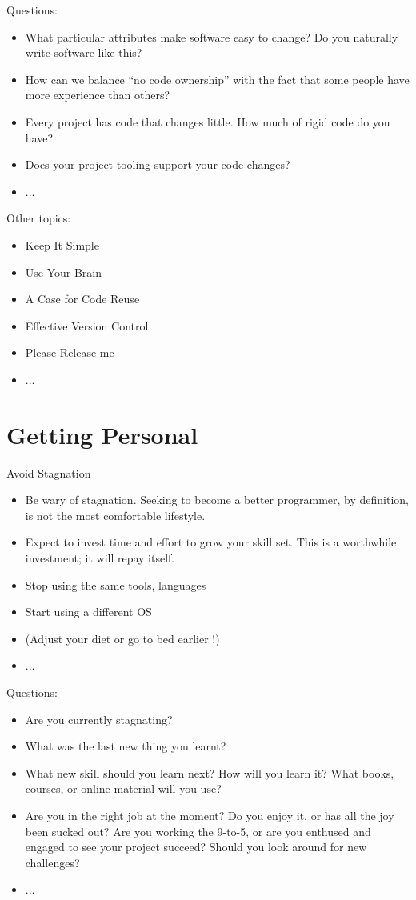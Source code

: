 \documentclass{mypresentation}
\begin{document}
Questions:
\begin{itemize}
\item What particular attributes make software easy to change? Do you naturally write software like this? 
\item How can we balance “no code ownership” with the fact that some people have more experience than others?
\item Every project has code that changes little. How much of rigid code do you have?
\item Does your project tooling support your code changes?
\item ...
\end{itemize}
\newpage

Other topics:
\begin{itemize}
\item Keep It Simple
\item Use Your Brain
\item A Case for Code Reuse
\item Effective Version Control
\item Please Release me
\item ...
\end{itemize}
\newpage

\section{Getting Personal}
Avoid Stagnation
\begin{itemize}
\item Be wary of stagnation. Seeking to become a better programmer, by definition, is not the most comfortable lifestyle.
\item Expect to invest time and effort to grow your skill set. This is a worthwhile investment; it will repay itself.
\item Stop using the same tools, languages
\item Start using a different OS
\item (Adjust your diet or go to bed earlier !)
\item ...
\end{itemize}
\newpage

Questions:
\begin{itemize}
\item Are you currently stagnating? 
\item What was the last new thing you learnt?
\item What new skill should you learn next? How will you learn it? What books, courses, or online material will you use?
\item Are you in the right job at the moment? Do you enjoy it, or has all the joy been sucked out? Are you working the 9-to-5, or are you enthused and engaged to see your project succeed? Should you look around for new challenges?
\item ...
\end{itemize}
\newpage
\end{document}
